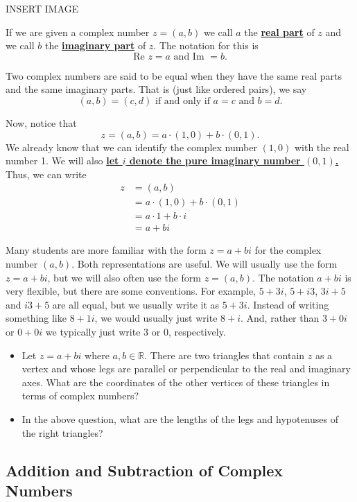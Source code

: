 \documentclass[11pt]{article}
\newenvironment{task}
	{\begin{mdframed}[linecolor=lightgray, linewidth=3pt]\raggedright}
	{\end{mdframed}}
\renewcommand\emph[1]{\underline{\bf{#1}}} %
\theoremstyle{definition}
\begin{document}
\begin{center}
  INSERT IMAGE
\end{center}

If we are given a complex number $z=(a,b)$ we call $a$ the \emph{real part} of $z$ and we call $b$ the \emph{imaginary part} of $z$. The 
notation for this is 
\[ \text{Re }z = a \text{ and } \text{Im }=b.\]

Two complex numbers are said to be equal when they have the same real parts and the same imaginary parts. That is (just like ordered pairs), we say
\[ (a,b) = (c,d) \text{ if and only if } a=c \text{ and } b=d. \]

Now, notice that
\[ z = (a,b) = a \cdot (1,0) + b \cdot (0,1). \]
We already know that we can identify the complex number $(1,0)$ with the real number 1. We will also \emph{let $i$ denote the pure imaginary number $(0,1)$.}
Thus, we can write
\begin{align*}
 z &= (a,b)\\ 
   &= a \cdot (1,0) + b \cdot (0,1)\\
   &= a\cdot 1 + b\cdot i\\
   &= a + bi
\end{align*}

Many students are more familiar with the form $z = a + bi$ for the complex number $(a,b)$. Both representations are useful. We will usually
use the form $z = a+bi$, but we will also often use the form $z=(a,b)$. The notation $a+bi$ is very flexible, but there are some conventions. For example,
$5+3i$, $5+i3$, $3i+5$ and $i3+5$ are all equal, but we usually write it as $5+3i$. Instead of writing something like $8+1i$, we would usually 
just write $8+i$. And, rather than $3+0i$ or $0+0i$ we typically just write $3$ or $0$, respectively.

\begin{task}
  \begin{itemize}
    \item Let $z=a+bi$ where $a,b\in \mathbb{R}$. There are two triangles that contain $z$ as a vertex and whose legs are parallel or perpendicular to the real and imaginary
  axes. What are the coordinates of the other vertices of these triangles in terms of complex numbers?
  \item In the above question, what are the lengths of the legs and hypotenuses of the right triangles?
  \end{itemize}
\end{task}

\subsection{Addition and Subtraction of Complex Numbers}
\end{document}
